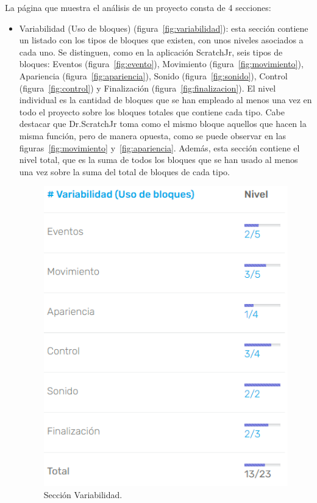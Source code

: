 \documentclass[a4paper, 12pt]{book}
\begin{document}
La página que muestra el análisis de un proyecto consta de 4 secciones:
\begin{itemize}
    \item Variabilidad (Uso de bloques) (figura~\ref{fig:variabilidad}): esta sección contiene un listado con los tipos de bloques que existen, con unos niveles asociados a cada uno.
    Se distinguen, como en la aplicación ScratchJr, seis tipos de bloques: Eventos (figura~\ref{fig:evento}), Movimiento (figura~\ref{fig:movimiento}), Apariencia (figura~\ref{fig:apariencia}), Sonido (figura~\ref{fig:sonido}), Control (figura~\ref{fig:control}) y Finalización (figura~\ref{fig:finalizacion}).
    El nivel individual es la cantidad de bloques que se han empleado al menos una vez en todo el proyecto sobre los bloques totales que contiene cada tipo. 
    Cabe destacar que Dr.ScratchJr toma como el mismo bloque aquellos que hacen la misma función, pero de manera opuesta, como se puede observar en las figuras~\ref{fig:movimiento} y~\ref{fig:apariencia}.
    Además, esta sección contiene el nivel total, que es la suma de todos los bloques que se han usado al menos una vez sobre la suma del total de bloques de cada tipo.
     \begin{figure}[H]
       \centering
       \includegraphics[keepaspectratio]{img/variabilidad.PNG}
       \caption{Sección Variabilidad.}

\end{figure}
\end{itemize}
\end{document}

